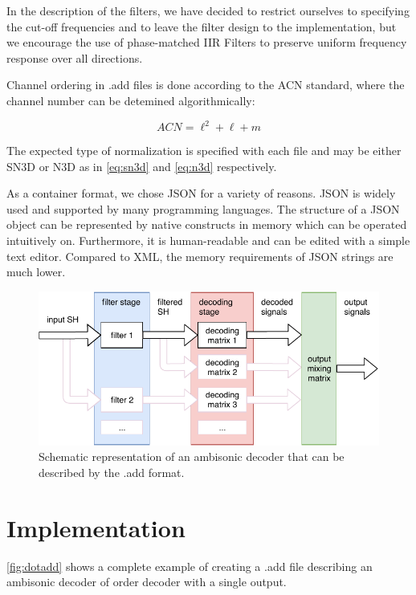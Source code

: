 \documentclass[a4paper, 10pt, twocolumn]{article}
\begin{document}
In the description of the filters, we have decided to restrict ourselves to specifying the cut-off frequencies and to leave the filter design to the implementation, but we encourage the use of phase-matched IIR Filters to preserve uniform frequency response over all directions.

Channel ordering in .add files is done according to the ACN standard, where the channel number can be detemined algorithmically:

\begin{equation}
    ACN=\ell^{2}+\ell+m
\end{equation}

The expected type of normalization is specified with each file and may be either SN3D or N3D as in \eqref{eq:sn3d} and \eqref{eq:n3d} respectively.

As a container format, we chose JSON for a variety of reasons. JSON is widely used and supported by many programming languages. The structure of a JSON object can be represented by native constructs in memory which can be operated intuitively on. Furthermore, it is human-readable and can be edited with a simple text editor. Compared to XML, the memory requirements of JSON strings are much lower.

\vspace{2mm}
\begin{figure}[htb]
\includegraphics[width=\the\linewidth]{decoding.pdf}
\caption{Schematic representation of an ambisonic decoder that can be described by the .add format.}
\end{figure}
\vspace{2mm}

\section{Implementation} \label{sec:Implementation}

\ref{fig:dotadd} shows a complete example of creating a .add file describing an ambisonic decoder of order decoder with a  single output.
\end{document}
